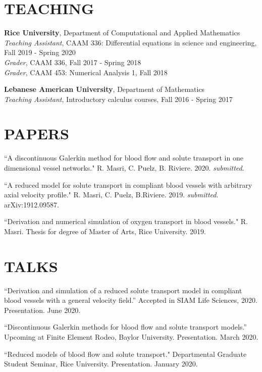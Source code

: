 \documentclass[margin]{res}
\begin{document}
\begin{resume}

\section{TEACHING}
\par
\textbf{Rice University},  Department of Computational and Applied Mathematics \\ 
\textit{Teaching Assistant}, CAAM 336: Differential equations in science and engineering, \\ Fall 2019 - Spring 2020   \\ 
\textit{Grader}, CAAM 336,  Fall 2017 - Spring 2018 \\ 
\textit{Grader}, CAAM 453: Numerical Analysis 1, Fall 2018
\par 
\textbf{Lebanese American University}, Department of Mathematics\\
\textit{Teaching Assistant}, Introductory calculus courses, Fall 2016 - Spring 2017

\section{PAPERS}
\par ``A discontinuous Galerkin method for blood flow and solute transport in one dimensional vessel networks."  
R. Masri, C. Puelz, B. Riviere. 2020. \textit{submitted}.
\par
``A reduced model for solute transport in compliant blood vessels with arbitrary axial velocity profile." R. Masri, C. Puelz, B.Riviere. 2019. \textit{submitted}. arXiv:1912.09587.

\par ``Derivation and numerical simulation of oxygen transport in blood vessels." R. Masri.  Thesis for degree of Master of Arts, Rice University. 2019. 
\section{TALKS }
\par ``Derivation and simulation of a reduced solute transport model in compliant blood vessels with a general velocity field.'' Accepted in SIAM Life Sciences, 2020. Presentation. June 2020.
\par 
``Discontinuous Galerkin methods for blood flow and solute transport models.'' Upcoming at Finite Element Rodeo, Baylor University. Presentation. March 2020.  
\par 
``Reduced models of blood flow and solute transport." Departmental Graduate Student Seminar, Rice University. Presentation. January 2020.

\end{resume}
\end{document}
